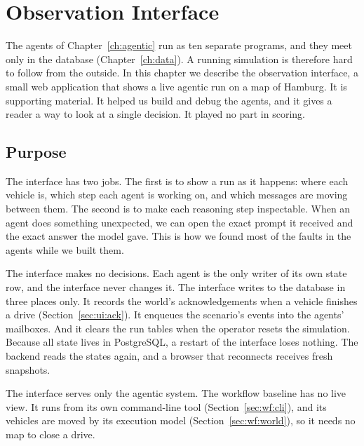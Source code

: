\chapter{Observation Interface}
\label{ch:ui}


The agents of Chapter~\ref{ch:agentic} run as ten separate programs, and they
meet only in the database (Chapter~\ref{ch:data}). A running simulation is
therefore hard to follow from the outside. In this chapter we describe the
observation interface, a small web application that shows a live agentic run
on a map of Hamburg. It is supporting material. It helped us build and debug
the agents, and it gives a reader a way to look at a single decision. It
played no part in scoring.

\section{Purpose}
\label{sec:ui:goals}

The interface has two jobs. The first is to show a run as it happens: where
each vehicle is, which step each agent is working on, and which messages are
moving between them. The second is to make each reasoning step inspectable.
When an agent does something unexpected, we can open the exact prompt it
received and the exact answer the model gave. This is how we found most of the
faults in the agents while we built them.

The interface makes no decisions. Each agent is the only writer of
its own state row, and the interface never changes it. The interface writes to
the database in three places only. It records the world's acknowledgements
when a vehicle finishes a drive (Section~\ref{sec:ui:ack}). It enqueues the
scenario's events into the agents' mailboxes. And it clears the run tables when
the operator resets the simulation. Because all state lives in PostgreSQL, a
restart of the interface loses nothing. The backend reads the states again,
and a browser that reconnects receives fresh snapshots.

The interface serves only the agentic system. The workflow baseline has no
live view. It runs from its own command-line tool
(Section~\ref{sec:wf:cli}), and its vehicles are moved by its execution model
(Section~\ref{sec:wf:world}), so it needs no map to close a drive.

